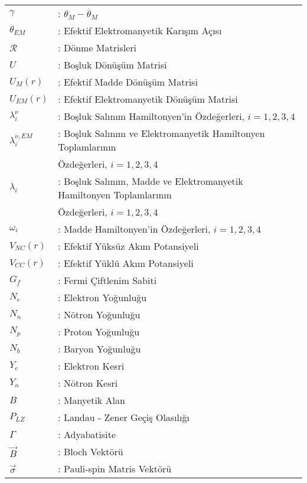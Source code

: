 \begin{longtable}{@{}l @{\hspace{10mm}} l }
$ \gamma                $ &: $\theta_{M}-\overline{\theta}_{M}$ \\
$ \theta_{EM}           $ &: Efektif Elektromanyetik Karışım Açısı \\
$ \mathcal{R}           $ &: Dönme Matrisleri \\
$ U                     $ &: Boşluk Dönüşüm Matrisi \\
$ U_{M}(r)              $ &: Efektif Madde Dönüşüm Matrisi \\
$ U_{EM}(r)             $ &: Efektif Elektromanyetik Dönüşüm Matrisi \\
$ \lambda^{\nu}_{i}     $ &: Boşluk Salınım Hamiltonyen'in Özdeğerleri, $ i = 1,2,3,4 $ \\
$ \lambda^{\nu,EM}_{i}  $ &: Boşluk Salınım ve Elektromanyetik Hamiltonyen Toplamlarının \\
& Özdeğerleri, $ i = 1,2,3,4 $ \\
$ \lambda_{i}           $ &: Boşluk Salınım, Madde ve Elektromanyetik Hamiltonyen Toplamlarının \\
& Özdeğerleri, $ i = 1,2,3,4 $ \\
$ \omega_{i}            $ &: Madde Hamiltonyen'in Özdeğerleri, $ i = 1,2,3,4 $ \\
$ V_{NC}(r)             $ &: Efektif Yüksüz Akım Potansiyeli \\
$ V_{CC}(r)             $ &: Efektif Yüklü Akım Potansiyeli \\
$ G_{f}                 $ &: Fermi Çiftlenim Sabiti \\
$ N_{e}                 $ &: Elektron Yoğunluğu \\
$ N_{n}                 $ &: Nötron Yoğunluğu \\
$ N_{p}                 $ &: Proton Yoğunluğu \\
$ N_{b}                 $ &: Baryon Yoğunluğu \\
$ Y_{e}                 $ &: Elektron Kesri \\
$ Y_{n}                 $ &: Nötron Kesri \\
$ B                     $ &: Manyetik Alan \\
$ P_{LZ}                $ &: Landau - Zener Geçiş Olasılığı \\
$ \Gamma                $ &: Adyabatisite \\
$ \vec{B}               $ &: Bloch Vektörü \\
$ \vec{\sigma}          $ &: Pauli-spin Matris Vektörü
\end{longtable}
